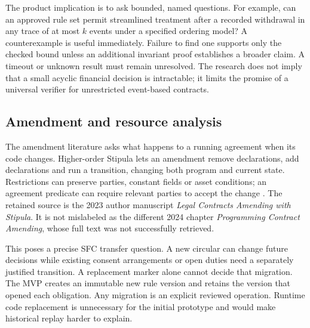 The product implication is to ask bounded, named questions. For example, can an
approved rule set permit streamlined treatment after a recorded withdrawal in
any trace of at most $k$ events under a specified ordering model? A counterexample
is useful immediately. Failure to find one supports only the checked bound unless
an additional invariant proof establishes a broader claim. A timeout or unknown
result must remain unresolved. The research does not imply that a small acyclic
financial decision is intractable; it limits the promise of a universal verifier
for unrestricted event-based contracts.

\subsection{Amendment and resource analysis}
\label{merge:P-02b-contract-evolution:00}


The amendment literature asks what happens to a running agreement when its code
changes. Higher-order Stipula lets an amendment remove declarations, add
declarations and run a transition, changing both program and current state.
Restrictions can preserve parties, constant fields or asset conditions; an
agreement predicate can require relevant parties to accept the change
\citep[secs.~4--6]{amending2023}. The retained source is the 2023 author manuscript
\emph{Legal Contracts Amending with Stipula}. It is not mislabeled as the different
2024 chapter \emph{Programming Contract Amending}, whose full text was not
successfully retrieved.


This poses a precise SFC transfer question. A new circular can change future
decisions while existing consent arrangements or open duties need a separately
justified transition. A replacement marker alone cannot decide that migration.
The MVP creates an immutable new rule version and retains the version that
opened each obligation. Any migration is an explicit reviewed operation.
Runtime code replacement is unnecessary for the initial prototype and would make
historical replay harder to explain.

